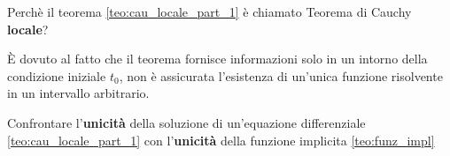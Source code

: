\begin{exercise}
	Perchè il teorema \ref{teo:cau_locale_part_1} è chiamato Teorema di Cauchy \textbf{locale}?
	\begin{solution}
		È dovuto al fatto che il teorema fornisce informazioni solo in un intorno della condizione iniziale $t_0$, non è assicurata l'esistenza di un'unica funzione risolvente in un intervallo arbitrario.
	\end{solution}
\end{exercise}

\begin{exercise}
	Confrontare l'\textbf{unicità} della soluzione di un'equazione differenziale \ref{teo:cau_locale_part_1} con l'\textbf{unicità} della funzione implicita \ref{teo:funz_impl}
\end{exercise}

